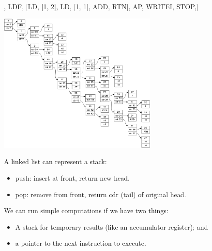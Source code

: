 \documentclass[professionalFonts]{beamer}
\makeatletter
\newcommand\pythonstyle{\lstset{
xleftmargin=1em,
framextopmargin=2em,
framexbottommargin=2em,
showspaces=false,
showtabs=false,
showstringspaces=false,
tabsize=4,
basicstyle=\ttfamily\small\setstretch{1},
backgroundcolor=\color{Background},
language=python,
commentstyle=\color{Comments}\slshape,
stringstyle=\color{Strings},
morecomment=[s][\color{Strings}]{"""}{"""},
morecomment=[s][\color{Strings}]{'''}{'''},
morekeywords={import,from,class,def,for,while,if,is,in,elif,else,not,and,or,print,break,continue,return,True,False,None,access,as,,del,except,exec,finally,global,import,lambda,pass,print,raise,try,assert},
keywordstyle={\color{Keywords}\bfseries},
morekeywords={[2]@invariant},
keywordstyle={[2]\color{Decorators}\slshape},
emph={self},
emphstyle={\color{self}\slshape},
%
}}
\newcommand\pythoninline[1]{{\pythonstyle\lstinline!#1!}}
\makeatother
\begin{document}
\begin{frame}[fragile]

\begin{python}
[LDC, [3, 4], LDF, [LD, [1, 2], LD, [1, 1], ADD, RTN],
              AP, WRITEI, STOP,]
\end{python}

\begin{center}
\includegraphics[width=8cm]{program_in_memory.png}
\end{center}

\end{frame}

\begin{frame}

A linked list can represent a stack:

\begin{itemize}

\item push: insert at front, return new head.
\item pop: remove from front, return cdr (tail) of original head.

\end{itemize}

% 
% 
% 
% 
% 
% 
% 

We can run simple computations if we have two things:

\begin{itemize}

\item A stack for temporary results (like an accumulator register); and
\item a pointer to the next instruction to execute.
\end{itemize}


\end{frame}
\end{document}
